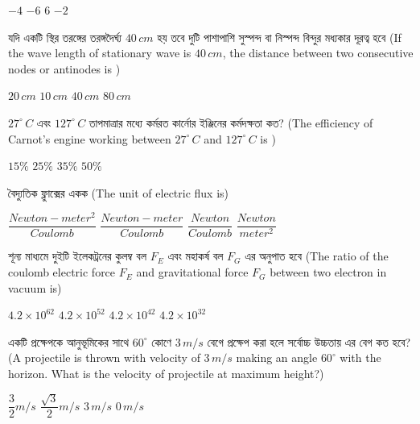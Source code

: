 \documentclass[addpoints]{exam}
\begin{document}
\begin{questions}
\begin{oneparchoices}
 \choice $ -4 $
\choice $ -6 $
\choice $ 6 $
\choice $ -2 $
\end{oneparchoices}

\question যদি একটি স্থির তরঙ্গের তরঙ্গদৈর্ঘ্য $ 40\,cm $ হয় তবে দুটি পাশাপাশি সুস্পন্দ বা নিস্পন্দ বিন্দুর মধ্যকার দূরত্ব হবে (If the wave length of stationary wave is $ 40\,cm $, the distance between two consecutive nodes or antinodes is )

\begin{oneparchoices}
\choice $ 20\,cm $
\choice $ 10\,cm $
\choice $ 40\,cm $
\choice $ 80\,cm $
\end{oneparchoices}


\question $ 27^{\circ}\,C $ এবং $ 127^{\circ}\,C $ তাপমাত্রার মধ্যে কর্মরত কার্নোর ইঞ্জিনের কর্মদক্ষতা কত? (The efficiency of Carnot's engine working between $ 27^{\circ}\,C $ and $ 127^{\circ}\,C $ is )

\begin{oneparchoices}
\choice  $ 15\% $
\choice   $ 25\% $
\choice   $ 35\% $
\choice   $ 50\% $
\end{oneparchoices}

\question  বৈদ্যুতিক ফ্লুাক্সের একক (The unit of electric flux is)

\begin{oneparchoices}
\choice $ \dfrac{Newton-meter^{2}}{Coulomb} $
\choice $ \dfrac{Newton-meter}{Coulomb} $
\choice $ \dfrac{Newton}{Coulomb} $
\choice $ \dfrac{Newton}{meter^{2}} $
\end{oneparchoices}

\question  শূন্য মাধ্যমে দুইটি ইলেকট্রনের কুলম্ব বল $ F_{E} $ এবং মহাকর্ষ বল $ {F}_{G} $ এর অনুপাত হবে (The ratio of the coulomb electric force $ F_{E} $ and gravitational force $ {F}_{G} $ between two electron in vacuum is)  

\begin{oneparchoices}
\choice $ 4.2\times 10^{62} $
\choice $ 4.2\times 10^{52} $
\choice $ 4.2\times 10^{42} $
\choice $ 4.2\times 10^{32} $
\end{oneparchoices}

\question  একটি প্রক্ষেপকে আনুভূমিকের সাথে $ 60^{\circ} $ কোণে $ 3\,m/s $ বেগে প্রক্ষেপ করা হলে সর্বোচ্চ উচ্চতায় এর বেগ কত হবে? (A projectile is thrown with velocity of $ 3\,m/s $ making an angle $ 60^{\circ} $ with the horizon. What is the velocity of projectile at maximum height?)

\begin{oneparchoices}
\choice  $\dfrac{3}{2} m/s$
\choice  $\dfrac{\sqrt{3}}{2}m/s$
\choice  $ 3\,m/s $
\choice  $ 0\,m/s $
\end{oneparchoices}


\end{questions}
\end{document}
